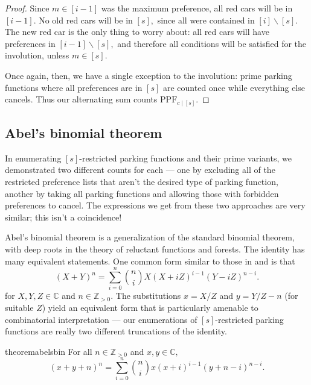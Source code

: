 \documentclass[12 pt]{amsart}
\theoremstyle{definition} %
\theoremstyle{remark} %
\begin{document}
\begin{proof}
    Since $m\in [i-1]$ was the maximum preference, all red cars will be in $[i-1]$. No old red cars will be in $[s],$ since all were contained in $[i]\backslash [s].$ The new red car is the only thing to worry about: all red cars will have preferences in $[i-1]\backslash [s],$ and therefore all conditions will be satisfied for the involution, unless $m\in [s].$

	Once again, then, we have a single exception to the involution: prime parking functions where all preferences are in $[s]$ are counted once while everything else cancels. Thus our alternating sum counts $\mathrm{PPF}_{c \mid [s]}$.
\end{proof}

\subsection*{Abel's binomial theorem}

In enumerating $[s]$-restricted parking functions and their prime variants, we demonstrated two different counts for each --- one by excluding all of the restricted preference lists that aren't the desired type of parking function, another by taking all parking functions and allowing those with forbidden preferences to cancel. The expressions we get from these two approaches are very similar; this isn't a coincidence!

Abel's binomial theorem is a generalization of the standard binomial theorem, with deep roots in the theory of reluctant functions and forests. The identity has many equivalent statements. One common form similar to those in \cite{shapiro-1991} and \cite{zucker-2024} is that
\[
	(X + Y)^{n} = \sum_{i = 0}^{n} \binom{n}{i} X (X + iZ)^{i - 1} (Y - i Z)^{n - i}.
\]
for $X, Y, Z \in \mathbb{C}$ and $n \in \mathbb{Z}_{> 0}$. The substitutions $x = X/Z$ and $y = Y/Z - n$ (for suitable $Z$) yield an equivalent form that is particularly amenable to combinatorial interpretation --- our enumerations of $[s]$-restricted parking functions are really two different truncations of the identity.

\begin{restatable}{theorem}{abelsbin}
	For all $n\in\mathbb{Z}_{>0}$ and $x,y\in\mathbb{C},$
    \[
		(x + y + n)^{n} = \sum_{i = 0}^{n} \binom{n}{i} x (x + i)^{i - 1} (y + n - i)^{n - i}.
	\]
\end{restatable}
\end{document}
